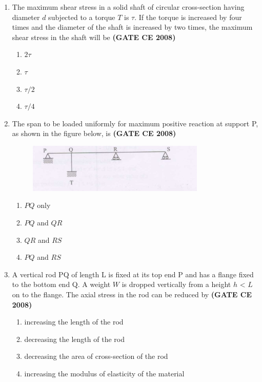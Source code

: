 \documentclass[journal]{IEEEtran}
\begin{document}
\begin{enumerate}
\item The maximum shear stress in a solid shaft of circular cross-section having diameter $d$ subjected to a torque $T$ is $\tau$. If the torque is increased by four times and the diameter of the shaft is increased by two times, the maximum shear stress in the shaft will be  \textbf{(GATE CE 2008)}
\begin{multicols}{2}
\begin{enumerate}
\item $2\tau$
\item $\tau$
\item $\tau /2$
\item $\tau /4$
\end{enumerate}
\end{multicols}

\item The span to be loaded uniformly for maximum positive  reaction at support P, as shown in the figure below, is \textbf{(GATE CE 2008)}
\begin{figure}[h]
    \centering
    \includegraphics[width=0.8\textwidth]{figs/fig8.png}
\end{figure}

\vspace{0.1cm}

\begin{multicols}{2}
\begin{enumerate}
\item $PQ$ only
\item $PQ$ and $QR$
\item $QR$ and $RS$
\item $PQ$ and $RS$
\end{enumerate}
\end{multicols}

\item A vertical rod PQ of length L is fixed at its top end P and has a flange fixed to the bottom end Q. A weight $W$ is dropped vertically from a height $h$ < $L$ on to the flange. The axial stress in the rod can be reduced by \textbf{(GATE CE 2008)}

\begin{enumerate}
\item increasing the length of the rod 
\item decreasing the length of the rod
\item decreasing the area of cross-section of the rod
\item increasing the modulus of elasticity of the material
\end{enumerate}


\end{enumerate}
\end{document}
